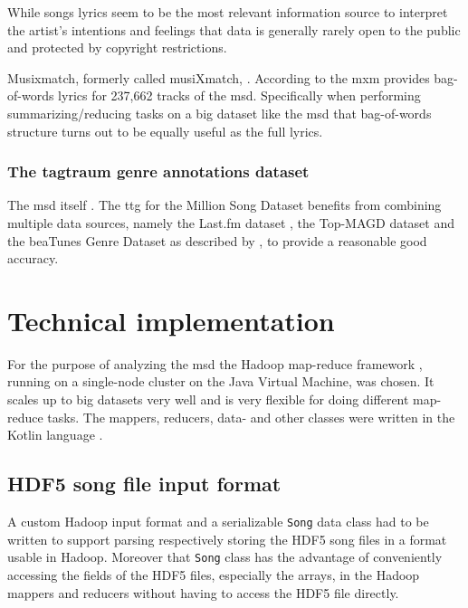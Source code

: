 \documentclass[                                                             %
        12pt,                                                                   %
        twoside                                                                 %
    ]{scrartcl}                                                                 %
\begin{document}
While songs lyrics seem to be the most relevant 
information source to interpret the artist's intentions and feelings
that data is generally rarely open to the public
and protected by copyright restrictions.

Musixmatch, formerly called musiXmatch, 
\parencite{musixmatch2018about}.
According to \textcite{bertin2012musixmatch} the \gls{mxm} provides 
bag-of-words lyrics for 237,662 tracks of the \gls{msd}.
Specifically when performing summarizing/reducing tasks 
on a big dataset like the \gls{msd} that bag-of-words structure
turns out to be equally useful as the full lyrics.

\subsubsection{The tagtraum genre annotations dataset}

The \gls{msd} itself 
\parencite[241]{schreiber2015improving}.
The \gls{ttg} for the Million Song Dataset
benefits from combining multiple data sources, 
namely the Last.fm dataset \parencite{bertin2012lastfm}, 
the Top-MAGD dataset \parencite{schindler2012facilitating}
and the beaTunes Genre Dataset \parencite[241]{schreiber2015improving} 
as described by \textcite[244]{schreiber2015tagtraum}, 
to provide a reasonable good accuracy.

\section{Technical implementation}

For the purpose of analyzing the \gls{msd} 
the Hadoop map-reduce framework \parencite{apache2018hadoop}, 
running on a single-node cluster 
on the Java Virtual Machine, was chosen.
It scales up to big datasets very well 
and is very flexible for doing different map-reduce tasks.
The mappers, reducers, data- and other classes 
were written in the Kotlin language \parencite{jetbrains2018kotlin}.

\subsection{HDF5 song file input format}

A custom Hadoop input format 
and a serializable \texttt{Song} data class 
had to be written to support parsing 
respectively storing the HDF5 song files 
in a format usable in Hadoop.
Moreover that \texttt{Song} class has the advantage 
of conveniently accessing the fields of the HDF5 files,
especially the arrays, in the Hadoop mappers and reducers
without having to access the HDF5 file directly.
\end{document}
